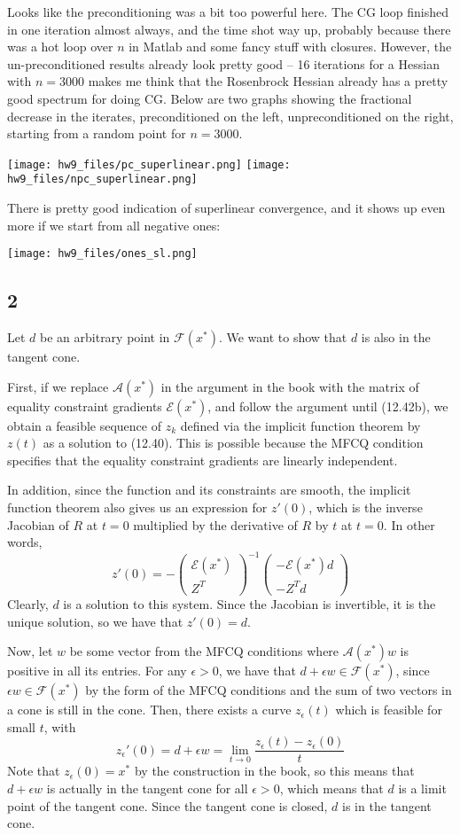 \documentclass{article}
\newcommand{\ep}{\epsilon}
\newcommand{\openm}{\begin{pmatrix}}
\newcommand{\closem}{\end{pmatrix}}
\begin{document}
Looks like the preconditioning was a bit too powerful here. The CG loop finished in one iteration almost always, and the time shot way up, probably because there was a hot loop over $n$ in Matlab and some fancy stuff with closures. However, the un-preconditioned results already look pretty good -- 16 iterations for a Hessian with $n=3000$ makes me think that the Rosenbrock Hessian already has a pretty good spectrum for doing CG.
Below are two graphs showing the fractional decrease in the iterates, preconditioned on the left, unpreconditioned on the right, starting from a random point for $n=3000$.

\texttt{[image: hw9\_files/pc\_superlinear.png]}
\texttt{[image: hw9\_files/npc\_superlinear.png]}

There is pretty good indication of superlinear convergence, and it shows up even more if we start from all negative ones:

\texttt{[image: hw9\_files/ones\_sl.png]}

\subsection*{2}
Let $d$ be an arbitrary point in $\mathscr{F}(x^*)$. We want to show that $d$ is also in the tangent cone.

First, if we replace $\mathscr{A}(x^*)$ in the argument in the book with the matrix of equality constraint gradients $\mathscr{E}(x^*)$, and follow the argument until (12.42b), we obtain a feasible sequence of $z_k$ defined via the implicit function theorem by $z(t)$ as a solution to (12.40). This is possible because the MFCQ condition specifies that the equality constraint gradients are linearly independent. 

In addition, since the function and its constraints are smooth, the implicit function theorem also gives us an expression for $z'(0)$, which is the inverse Jacobian of $R$ at $t=0$ multiplied by the derivative of $R$ by $t$ at $t=0$. In other words, 
\[z'(0)=-\openm \mathscr{E}(x^*)\\Z^T\closem^{-1}\openm-\mathscr{E}(x^*)d\\-Z^Td\closem\]
Clearly, $d$ is a solution to this system. Since the Jacobian is invertible, it is the unique solution, so we have that $z'(0)=d$.

Now, let $w$ be some vector from the MFCQ conditions where $\mathscr{A}(x^*)w$ is positive in all its entries. For any $\ep>0$, we have that $d+\ep w\in\mathscr{F}(x^*)$, since $\ep w\in\mathscr{F}(x^*)$ by the form of the MFCQ conditions and the sum of two vectors in a cone is still in the cone. Then, there exists a curve $z_\ep(t)$ which is feasible for small $t$, with 
\[z_\ep'(0)=d+\ep w=\lim_{t\to 0}\frac{z_\ep(t)-z_\ep(0)}{t}\]
Note that $z_\ep(0)=x^*$ by the construction in the book, so this means that $d+\ep w$ is actually in the tangent cone for all $\ep>0$, which means that $d$ is a limit point of the tangent cone. Since the tangent cone is closed, $d$ is in the tangent cone.
\end{document}
